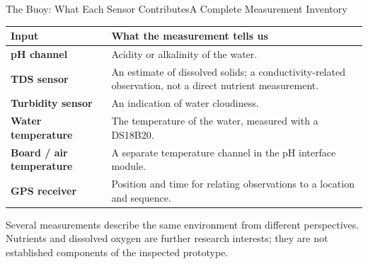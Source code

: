 \begin{frame}{The Buoy: What Each Sensor Contributes}{A Complete Measurement Inventory}
\small\renewcommand{\arraystretch}{1.4}
\par\noindent\begin{tabularx}{\textwidth}{@{}>{\raggedright\arraybackslash}p{}>{\raggedright\arraybackslash}X@{}}
\toprule
\textbf{Input} & \textbf{What the measurement tells us}\\\midrule
\textbf{pH channel} & Acidity or alkalinity of the water.\\
\textbf{TDS sensor} & An estimate of dissolved solids; a conductivity-related observation, not a direct nutrient measurement.\\
\textbf{Turbidity sensor} & An indication of water cloudiness.\\
\textbf{Water temperature} & The temperature of the water, measured with a DS18B20.\\
\textbf{Board / air temperature} & A separate temperature channel in the pH interface module.\\
\textbf{GPS receiver} & Position and time for relating observations to a location and sequence.\\\bottomrule
\end{tabularx}\par
\vspace{.7em}
\normalsize\alert{Several measurements describe the same environment from different perspectives.}
\vfill{\scriptsize Nutrients and dissolved oxygen are further research interests; they are not established components of the inspected prototype.}
\end{frame}

